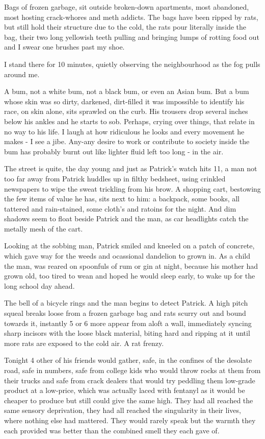 \documentclass[19pt,openany]{book}
\begin{document}
Bags of frozen garbage, sit outside broken-down apartments, most abandoned,
most hosting crack-whores and meth addicts. The bags have been ripped by rats,
but still hold their structure due to the cold, the rats pour literally
inside the bag, their two long yellowish teeth pulling and bringing lumps of rotting
food out and I swear one brushes past my shoe.

I stand there for 10 minutes, quietly observing the neighbourhood as the fog
pulls around me.

A bum, not a white bum, not a black bum, or even an Asian bum. But a bum
whose skin was so dirty, darkened, dirt-filled it was impossible to identify
his race, on skin alone, sits sprawled on the curb. His trousers drop several
inches below his ankles and he starts to sob. Perhaps,
crying over things, that relate in no way to his life.
I laugh at how ridiculous he looks and every movement he makes - I see a jibe.
Any-any desire to work or contribute to society inside the bum
has probably burnt out like lighter fluid left too long - in the air.

The street is quite, the day young and just as Patrick's watch hits
11, a man not too far
away from Patrick huddles up in filthy bedsheet, using crinkled
newspapers to wipe the sweat trickling
from his brow. A shopping cart, bestowing the few items of value he has, sits
next to him: a backpack, some books, all tattered and rain-stained, some
cloth's and ratoins for the night. And dim shadows seem to float beside Patrick and
the man, as car headlights catch the metally mesh of the cart.

Looking at the sobbing man, Patrick smiled and kneeled on a patch of concrete,
which gave way for the weeds and ocassional dandelion to grown in.
As a child the man, was reared on spoonfuls of rum or gin at night, because
his mother had grown old, too tired to wean and hoped he would sleep early, to wake
up for the long school day ahead.

The bell of a bicycle rings and the man begins to detect Patrick.
A high pitch squeal breaks loose from a frozen garbage bag and rats scurry out
and bound towards it, instantly 5 or 6 more appear from aloft a wall, immediately
syncing sharp incisors with the loose black material, biting hard and ripping at it
until more rats are exposed to the cold air. A rat frenzy.

Tonight 4 other of his friends would gather, safe, in the confines of
the desolate road, safe in numbers, safe from college kids who would
throw rocks at them from their trucks and safe from crack dealers that
would try peddling them low-grade product at a low-price, which was actually
laced with fentanyl as it would be cheaper to produce but still could give the same high.
They had all reached the same sensory deprivation, they had all reached the singularity
in their lives, where nothing else had mattered. They would rarely speak but the warmth
they each provided was better than the combined smell they each gave of.
\end{document}
